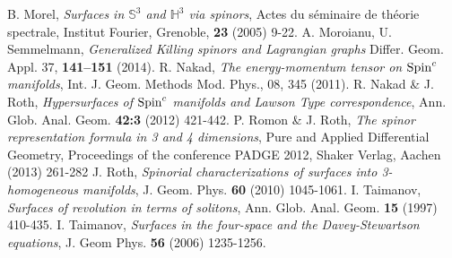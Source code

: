 \documentclass{amsart}
\begin{document}
\begin{thebibliography}{}
 B. Morel, \emph{Surfaces in $\mathbb{S}^3$ and $\mathbb{H}^3$ via spinors}, Actes du s\'eminaire de th\'eorie spectrale, Institut Fourier, Grenoble, \textbf{23} (2005) 9-22.
  A. Moroianu, U. Semmelmann, \emph{Generalized Killing spinors and Lagrangian graphs}  
Differ. Geom. Appl. 37, \textbf{141--151} (2014).
 R. Nakad, \emph{The energy-momentum tensor on ${\rm Spin}^c$ manifolds},  Int. J. Geom. Methods Mod. Phys., 08, 345 (2011).
 R. Nakad \& J. Roth, \emph{Hypersurfaces of ${\rm Spin}^c$ manifolds and Lawson Type correspondence}, Ann. Glob. Anal. Geom. \textbf{42:3} (2012) 421-442.
 P. Romon \& J. Roth, \emph{The spinor representation formula in 3 and 4 dimensions}, Pure and Applied Differential Geometry, Proceedings of the conference PADGE 2012, Shaker Verlag, Aachen (2013) 261-282
 J. Roth, \emph{Spinorial characterizations of surfaces into 3-homogeneous manifolds}, J. Geom. Phys. \textbf{60} (2010) 1045-1061.
 I. Taimanov, \emph{Surfaces of revolution in terms of solitons}, Ann. Glob. Anal. Geom. \textbf{15} (1997) 410-435.
 I. Taimanov, \emph{Surfaces in the four-space and the Davey-Stewartson equations}, J. Geom Phys. \textbf{56} (2006) 1235-1256. 
\end{thebibliography}
\end{document}
